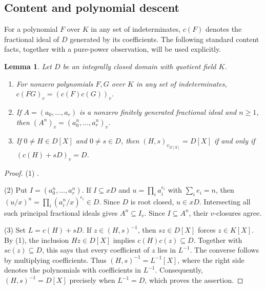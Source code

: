 \documentclass[11pt]{amsart}
\newtheorem{lemma}[theorem]{Lemma}
\theoremstyle{definition}
\theoremstyle{remark}
\begin{document}
\subsection{Content and polynomial descent}

For a polynomial $F$ over $K$ in any set of indeterminates,
$c(F)$ denotes the fractional ideal of $D$ generated by its
coefficients. The following standard content facts, together
with a pure-power observation, will be used explicitly.

\begin{lemma}\label{l:normal-content}
Let $D$ be an integrally closed domain with quotient field $K$.
\begin{enumerate}
\item For nonzero polynomials $F,G$ over $K$ in any set of
indeterminates, $c(FG)_v=(c(F)c(G))_v$.
\item If $A=(a_0,\ldots,a_r)$ is a nonzero finitely generated
fractional ideal and $n\geq1$, then
$(A^n)_v=(a_0^n,\ldots,a_r^n)_v$.
\item If $0\ne H\in D[X]$ and $0\ne s\in D$, then
$(H,s)_{v_{D[X]}}=D[X]$ if and only if $(c(H)+sD)_v=D$.
\end{enumerate}
\end{lemma}
\begin{proof}
(1) \cite[Proposition 34.8]{Gilmer}.

(2) Put $I=(a_0^n,\ldots,a_r^n)$. If $I\subseteq xD$ and
$u=\prod_i a_i^{e_i}$ with $\sum_i e_i=n$, then
$(u/x)^n=\prod_i(a_i^n/x)^{e_i}\in D$.
Since $D$ is root closed, $u\in xD$. Intersecting all such
principal fractional ideals gives $A^n\subseteq I_v$.
Since $I\subseteq A^n$, their $v$-closures agree.

(3) Set $L=c(H)+sD$. If $z\in(H,s)^{-1}$, then $sz\in D[X]$
forces $z\in K[X]$. By (1), the inclusion $Hz\in D[X]$
implies $c(H)c(z)\subseteq D$. Together with $sc(z)\subseteq D$,
this says that every coefficient of $z$ lies in $L^{-1}$.
The converse follows by multiplying coefficients. Thus
$(H,s)^{-1}=L^{-1}[X]$, where the right side denotes the
polynomials with coefficients in $L^{-1}$.
Consequently, $(H,s)^{-1}=D[X]$ precisely when $L^{-1}=D$,
which proves the assertion.
\end{proof}
\end{document}
